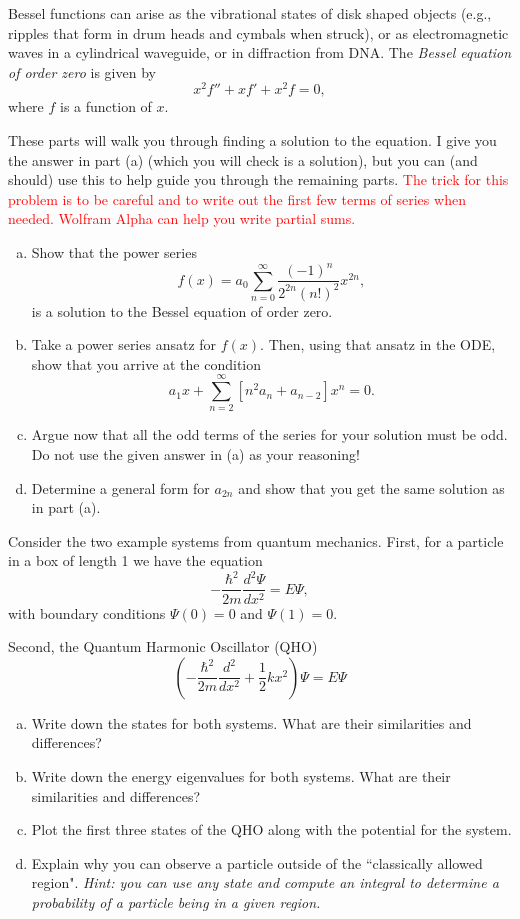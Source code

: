 \documentclass[12pt]{amsbook}
\begin{document}
\newpage
\begin{problem}
Bessel functions can arise as the vibrational states of disk shaped objects (e.g., ripples that form in drum heads and cymbals when struck), or as electromagnetic waves in a cylindrical waveguide, or in diffraction from DNA.  The \emph{Bessel equation of order zero} is given by
\[
x^2 f''+xf'+x^2f =0,
\]
where $f$ is a function of $x$.

These parts will walk you through finding a solution to the equation.  I give you the answer in part (a) (which you will check is a solution), but you can (and should) use this to help guide you through the remaining parts. \textcolor{red}{The trick for this problem is to be careful and to write out the first few terms of series when needed. Wolfram Alpha can help you write partial sums.}
\begin{enumerate}[(a)]
    \item Show that the power series
    \[
        f(x) = a_0 \sum_{n=0}^\infty \frac{(-1)^n}{2^{2n} (n!)^2} x^{2n},
    \]
    is a solution to the Bessel equation of order zero.
    \item Take a power series ansatz for $f(x)$.  Then, using that ansatz in the ODE, show that you arrive at the condition
    \[
        a_1x + \sum_{n=2}^\infty \left[ n^2 a_n + a_{n-2} \right]x^n = 0.
    \]
    \item Argue now that all the odd terms of the series for your solution must be odd. Do not use the given answer in (a) as your reasoning!
    \item Determine a general form for $a_{2n}$ and show that you get the same solution as in part (a).
\end{enumerate}
\end{problem}


\newpage
\begin{problem}
Consider the two example systems from quantum mechanics. First, for a particle in a box of length 1 we have the equation
\[
-\frac{\hbar^2}{2m}\frac{d^2 \Psi}{dx^2} = E\Psi,
\]
with boundary conditions $\Psi(0)=0$ and $\Psi(1)=0$.

Second,  the Quantum Harmonic Oscillator (QHO)
\[
\left(-\frac{\hbar^2}{2m} \frac{d^2}{dx^2} + \frac{1}{2} k x^2\right) \Psi = E\Psi
\]
\begin{enumerate}[(a)]
    \item Write down the states for both systems. What are their similarities and differences?
    \item Write down the energy eigenvalues for both systems. What are their similarities and differences?
    \item Plot the first three states of the QHO along with the potential for the system.
    \item Explain why you can observe a particle outside of the ``classically allowed region". \emph{Hint: you can use any state and compute an integral to determine a probability of a particle being in a given region.}
\end{enumerate}
\end{problem}
\end{document}
